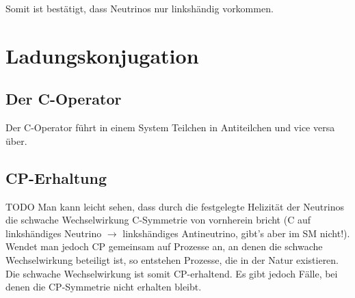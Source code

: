 Somit ist bestätigt, dass Neutrinos nur linkshändig vorkommen.

\section{Ladungskonjugation}
\subsection{Der C-Operator}
Der C-Operator führt in einem System Teilchen in Antiteilchen und vice versa über.
\subsection{CP-Erhaltung}
TODO
Man kann leicht sehen, dass durch die festgelegte Helizität der Neutrinos die schwache Wechselwirkung C-Symmetrie von vornherein bricht (C auf linkshändiges Neutrino $\rightarrow$ linkshändiges Antineutrino, gibt's aber im SM nicht!).
Wendet man jedoch CP gemeinsam auf Prozesse an, an denen die schwache Wechselwirkung beteiligt ist, so entstehen Prozesse, die in der Natur existieren.
Die schwache Wechselwirkung ist somit CP-erhaltend.
Es gibt jedoch Fälle, bei denen die CP-Symmetrie nicht erhalten bleibt.
